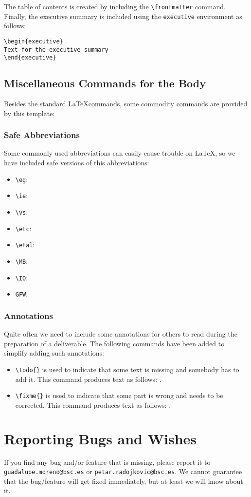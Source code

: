 \documentclass[11pt, a4paper, twoside]{montblanc2}
\begin{document}
The table of contents is created by including the \verb|\frontmatter| command. Finally, the 
executive summary is included using the \texttt{executive} environment as follows:
\begin{verbatim}
\begin{executive}
Text for the executive summary
\end{executive}
\end{verbatim}

\subsection{Miscellaneous Commands for the Body}
Besides the standard \LaTeX commands, some commodity commands are provided by this template:

\subsubsection{Safe Abbreviations}
Some commonly used abbreviations can easily cause trouble on \LaTeX, so we have included safe 
versions of this abbreviations:
\begin{itemize}
\item \verb|\eg|: \eg
\item \verb|\ie|: \ie
\item \verb|\vs|: \vs
\item \verb|\etc|: \etc
\item \verb|\etal|: \etal
\item \verb|\MB|: \MB
\item \verb|\IO|: \IO
\item \verb|GFW|: \GFW
\end{itemize}

\subsubsection{Annotations}
Quite often we need to include some annotations for others to read during the preparation of a 
deliverable. The following commands have been added to simplify adding such annotations:
\begin{itemize}
\item \verb|\todo{}| is used to indicate that some text is missing and somebody has to add it. This 
command produces text as follows: .
\item \verb|\fixme{}| is used to indicate that some part is wrong and needs to be corrected. This 
command produces text as follows: .
\end{itemize}

\section{Reporting Bugs and Wishes}
If you find any bug and\slash or feature that is missing, please report it to 
\texttt{guadalupe.moreno@bsc.es} or \texttt{petar.radojkovic@bsc.es}. We cannot guarantee that the bug\slash feature will get fixed 
immediately, but at least we will know about it.
\end{document}
